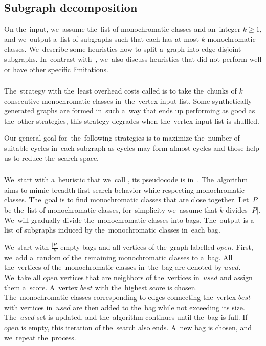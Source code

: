 \subsection{Subgraph decomposition}%
\label{sec:decomposition}

On the~input, we~assume the~list of monochromatic classes
and an~integer $k\geq 1$, and we~output a~list of subgraphs
such that each has at most $k$ monochromatic classes.
We~describe some heuristics how to split a~graph into edge disjoint subgraphs.
In~contrast with~\cite{my_paper}, we~also discuss heuristics
that did not perform well or have other specific limitations.

\subsubsection*{\None{}}

The~strategy with the~least overhead costs called \None{}
is to take the~chunks of $k$ consecutive
monochromatic classes in~the~vertex input list.
Some synthetically generated graphs are formed in~such a~way
that \None{} ends up performing as good as the~other strategies,
this strategy degrades when the~vertex input list is shuffled.

Our general goal for~the~following strategies
is to maximize the~number of suitable cycles in~each
subgraph as cycles may form almost cycles and those help us
to reduce the~search space.

\subsubsection*{\Neighbors{}}

We~start with a~heuristic that we~call \Neighbors{},
its pseudocode is in~.
The~algorithm aims to mimic breadth-first-search
behavior while respecting monochromatic classes.
The~goal is to find monochromatic classes that are close together.
Let~$P$ be the~list of monochromatic classes,
for~simplicity we~assume that $k$ divides $|P|$.
We~will gradually divide the~monochromatic classes into bags.
The~output is a list of subgraphs induced by the~monochromatic classes in~each bag.

We~start with $\frac{|P|}{k}$ empty bags
and all vertices of the~graph labelled $open$.
First, we~add a~random of the~remaining monochromatic classes to a~bag.
All the~vertices of the~monochromatic classes in~the~bag are denoted by $used$.
We~take all $open$ vertices that are neighbors of the~vertices in~$used$ and assign
them a~score. A~vertex $best$ with the~highest score is chosen.
The~monochromatic classes corresponding to edges connecting the~vertex $best$
with vertices in~$used$ are then added to the~bag while not exceeding its size.
The~$used$ set is updated, and the~algorithm continues until the~bag is full.
If~$open$ is empty, this iteration of the~search also ends.
A~new bag is chosen, and we~repeat the~process.

